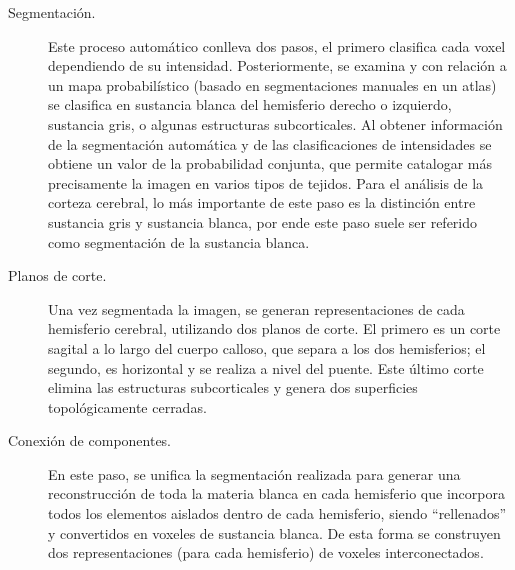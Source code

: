 \begin{description}
\item [Segmentación.] Este proceso automático conlleva dos pasos, el primero clasifica cada voxel
dependiendo de su intensidad. Posteriormente, se examina y con relación a un mapa probabilístico
(basado en segmentaciones manuales en un atlas) se clasifica en sustancia blanca del hemisferio
derecho o izquierdo, sustancia gris, o algunas estructuras subcorticales. Al obtener información de la
segmentación automática y de las clasificaciones de intensidades se obtiene un valor de la probabilidad
conjunta, que permite catalogar más precisamente la imagen en varios tipos de tejidos. Para el análisis
de la corteza cerebral, lo más importante de este paso es la distinción entre sustancia gris y sustancia
blanca, por ende este paso suele ser referido como segmentación de la sustancia blanca.

\item [Planos de corte.] Una vez segmentada la imagen, se generan representaciones de cada hemisferio
cerebral, utilizando dos planos de corte. El primero es un corte sagital a lo largo del cuerpo calloso, que separa a los dos hemisferios; el segundo, es horizontal y se realiza a nivel del puente. Este último corte
elimina las estructuras subcorticales y genera dos superficies topológicamente cerradas.

\item [Conexión de componentes.] En este paso, se unifica la segmentación realizada para generar una
reconstrucción de toda la materia blanca en cada hemisferio que incorpora todos los elementos aislados
dentro de cada hemisferio, siendo ``rellenados'' y convertidos en voxeles de sustancia blanca. De esta
forma se construyen dos representaciones (para cada hemisferio) de voxeles interconectados.


\end{description}
